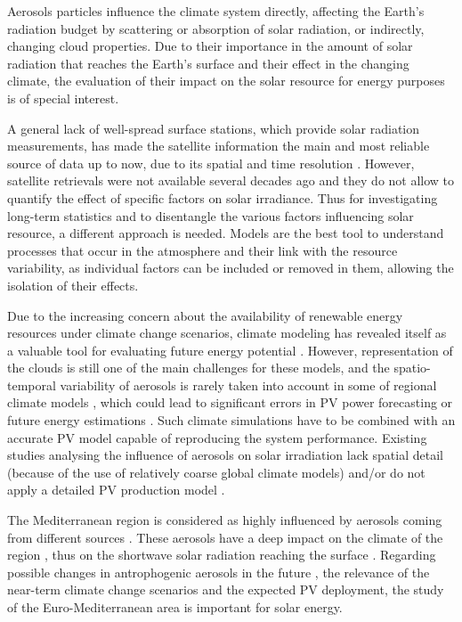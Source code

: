 Aerosols particles influence the climate system directly, affecting the Earth’s radiation budget by scattering or absorption of solar radiation, or indirectly, changing cloud properties. Due to their importance in the amount of solar radiation that reaches the Earth’s surface and their effect in the changing climate, the evaluation of their impact on the solar resource for energy purposes is of special interest.

A general lack of well-spread surface stations, which provide solar radiation measurements, has made the satellite information the main and most reliable source of data up to now, due to its spatial and time resolution \citep{Posselt2012, Ineichen2014}. However, satellite retrievals were not available several decades ago and they do not allow to quantify the effect of specific factors on solar irradiance. Thus for investigating long-term statistics and to disentangle the various factors influencing solar resource, a different approach is needed. Models are the best tool to understand processes that occur in the atmosphere and their link with the resource variability, as individual factors can be included or removed in them, allowing the isolation of their effects.

Due to the increasing concern about the availability of renewable energy resources under climate change scenarios, climate modeling has revealed itself as a valuable tool for evaluating future energy potential \citep{Crook2011, Gaetani2014, Gaetani2015, Jerez2015, Jerez2015climix, Tobin2016}. However, representation of the clouds is still one of the main challenges for these models, and the spatio-temporal variability of aerosols is rarely taken into account in some of regional climate models \citep{Bartok2017}, which could lead to significant errors in PV power forecasting or future energy estimations \citep{Rieger2017}. Such climate simulations have to be combined with an accurate PV model capable of reproducing the system performance. Existing studies analysing the influence of aerosols on solar irradiation lack spatial detail (because of the use of relatively coarse global climate models) and/or do not apply a detailed PV production model \citep{Bergin2017}. 

The Mediterranean region is considered as highly influenced by aerosols coming from different sources \citep{Lelieveld}. These aerosols have a deep impact on the climate of the region \citep{Nabat2014, Nabat2014a}, thus on the shortwave solar radiation reaching the surface \citep{Mallet2016}. Regarding possible changes in antrophogenic aerosols in the future \citep{Gaetani2014, Jimenez-Guerrero2011}, the relevance of the near-term climate change scenarios and the expected PV deployment, the study of the Euro-Mediterranean area is important for solar energy.

